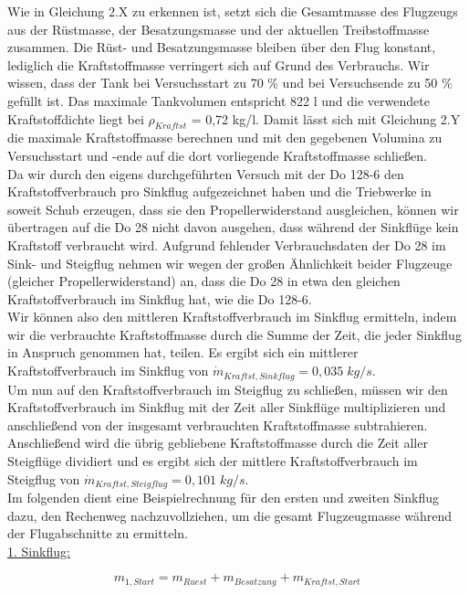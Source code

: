 Wie in Gleichung 2.X zu erkennen ist, setzt sich die Gesamtmasse des Flugzeugs aus der Rüstmasse, der Besatzungsmasse und der aktuellen Treibstoffmasse zusammen. Die Rüst- und Besatzungsmasse bleiben über den Flug konstant, lediglich die Kraftstoffmasse verringert sich auf Grund des Verbrauchs. Wir wissen, dass der Tank bei Versuchsstart zu 70 \% und bei Versuchsende zu 50 \% gefüllt ist. Das maximale Tankvolumen entspricht 822 {l} und die verwendete Kraftstoffdichte liegt bei $\rho_{Kraftst}$ = 0,72 {kg/l}. Damit lässt sich mit Gleichung 2.Y die maximale Kraftstoffmasse berechnen und mit den gegebenen Volumina zu Versuchsstart und -ende auf die dort vorliegende Kraftstoffmasse schließen.
\\
Da wir durch den eigens durchgeführten Versuch mit der Do 128-6 den Kraftstoffverbrauch pro Sinkflug aufgezeichnet haben und die Triebwerke in soweit Schub erzeugen, dass sie den Propellerwiderstand ausgleichen, können wir übertragen auf die Do 28 nicht davon ausgehen, dass während der Sinkflüge kein Kraftstoff verbraucht wird. Aufgrund fehlender Verbrauchsdaten der Do 28 im Sink- und Steigflug nehmen wir wegen der großen Ähnlichkeit beider Flugzeuge (gleicher Propellerwiderstand) an, dass die Do 28 in etwa den gleichen Kraftstoffverbrauch im Sinkflug hat, wie die Do 128-6.
\\
Wir können also den mittleren Kraftstoffverbrauch im Sinkflug ermitteln, indem wir die verbrauchte Kraftstoffmasse durch die Summe der Zeit, die jeder Sinkflug in Anspruch genommen hat, teilen. Es ergibt sich ein mittlerer Kraftstoffverbrauch im Sinkflug von $\dot{m}_{Kraftst,Sinkflug} = 0,035 \; {kg/s}$.
\\
Um nun auf den Kraftstoffverbrauch im Steigflug zu schließen, müssen wir den Kraftstoffverbrauch im Sinkflug mit der Zeit aller Sinkflüge multiplizieren und anschließend von der insgesamt verbrauchten Kraftstoffmasse subtrahieren. Anschließend wird die übrig gebliebene Kraftstoffmasse durch die Zeit aller Steigflüge dividiert und es ergibt sich der mittlere Kraftstoffverbrauch im Steigflug von $\dot{m}_{Kraftst,Steigflug} = 0,101 \; {kg/s}$.
\\ 
Im folgenden dient eine Beispielrechnung für den ersten und zweiten Sinkflug dazu, den Rechenweg nachzuvollziehen, um die gesamt Flugzeugmasse während der Flugabschnitte zu ermitteln.
\\

\underline{1. Sinkflug:}

\begin{equation*}
m_{1,Start} = m_{Ruest} + m_{Besatzung} + m_{Kraftst,Start}
\end{equation*}

